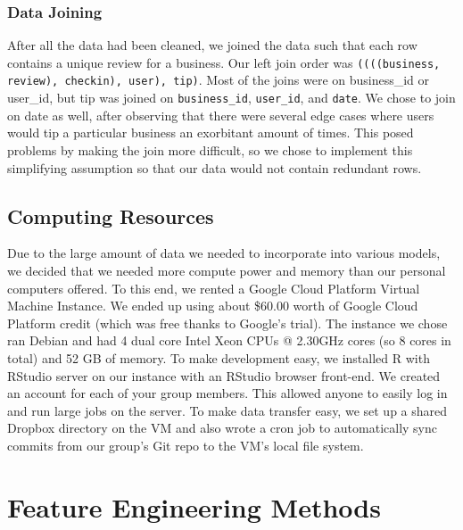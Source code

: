 \documentclass[10pt]{article}
\begin{document}
\subsubsection{Data Joining}
After all the data had been cleaned, we joined the data such that each row contains a unique review for a business. Our left join order was \texttt{((((business, review), checkin),  user), tip)}. Most of the joins were on business\_id or user\_id, but tip was joined on \texttt{business\_id}, \texttt{user\_id}, and \texttt{date}. We chose to join on date as well, after observing that there were several edge cases where users would tip a particular business an exorbitant amount of times. This posed problems by making the join more difficult, so we chose to implement this simplifying assumption so that our data would not contain redundant rows.

\subsection{Computing Resources}
Due to the large amount of data we needed to incorporate into various models, we decided that we needed more compute power and memory than our personal computers offered. To this end, we rented a Google Cloud Platform Virtual Machine Instance. We ended up using about \$60.00 worth of Google Cloud Platform credit (which was free thanks to Google's trial). The instance we chose ran Debian and had 4 dual core Intel Xeon CPUs @ 2.30GHz cores (so 8 cores in total) and 52 GB of memory. To make development easy, we installed R with RStudio server on our instance with an RStudio browser front-end. We created an account for each of your group members. This allowed anyone to easily log in and run large jobs on the server. To make data transfer easy, we set up a shared Dropbox directory on the VM and also wrote a cron job to automatically sync commits from our group's Git repo to the VM's local file system.

\section{Feature Engineering Methods}
\end{document}
